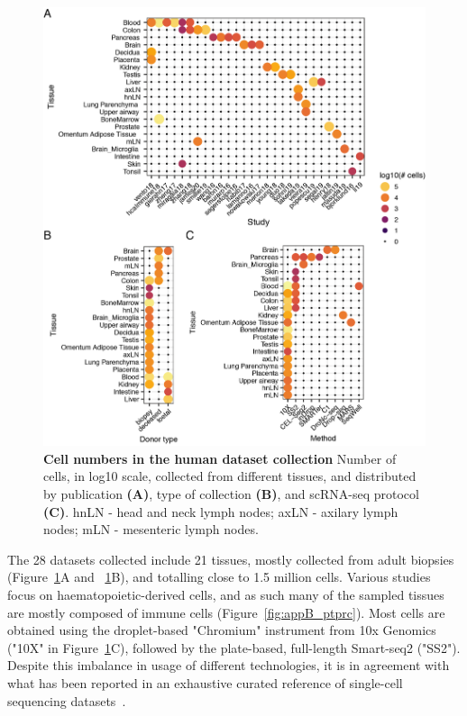 \begin{figure}[ht!]
    \centering    
    \includegraphics[width=1.0\textwidth]{Chapter3/Figs/chap4_countsHumanAtlas.png} %
    \caption[Cell numbers in the human dataset collection]{\textbf{Cell numbers in the human dataset collection} \newline Number of cells, in log10 scale, collected from different tissues, and distributed by publication \textbf{(A)}, type of collection \textbf{(B)}, and scRNA-seq protocol \textbf{(C)}. hnLN - head and neck lymph nodes; axLN - axilary lymph nodes; mLN - mesenteric lymph nodes.}
    \label{fig:chap3_humancells}
\end{figure}

The 28 datasets collected include 21 tissues, mostly collected from adult biopsies (Figure~\ref{fig:chap3_humancells}A and ~\ref{fig:chap3_humancells}B), and totalling close to 1.5 million cells. Various studies focus on haematopoietic-derived cells, and as such many of the sampled tissues are mostly composed of immune cells (Figure~\ref{fig:appB_ptprc}). Most cells are obtained using the droplet-based "Chromium" instrument from 10x Genomics ("10X" in Figure~\ref{fig:chap3_humancells}C), followed by the plate-based, full-length Smart-seq2 ("SS2"). Despite this imbalance in usage of different technologies, it is in agreement with what has been reported in an exhaustive curated reference of single-cell sequencing datasets~\citep{svensson_curated_2019}.

